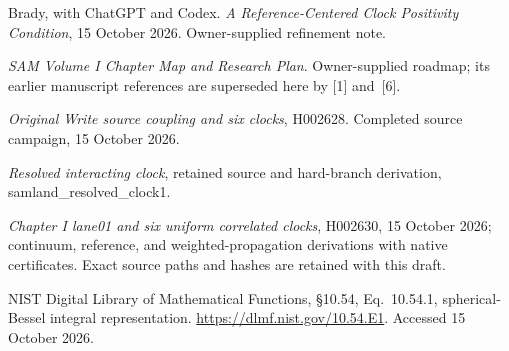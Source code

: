 \documentclass[10pt,twocolumn,letterpaper]{article}
\begin{document}
\noindent[2] Brady, with ChatGPT and Codex. \emph{A Reference-Centered Clock Positivity Condition}, 15 October 2026. Owner-supplied refinement note.

\noindent[3] \emph{SAM Volume I Chapter Map and Research Plan}. Owner-supplied roadmap; its earlier manuscript references are superseded here by [1] and~[6].

\noindent[4] \emph{Original Write source coupling and six clocks}, H002628. Completed source campaign, 15 October 2026.

\noindent[5] \emph{Resolved interacting clock}, retained source and hard-branch derivation, samland\_resolved\_clock1.

\noindent[6] \emph{Chapter I lane01 and six uniform correlated clocks}, H002630, 15 October 2026; continuum, reference, and weighted-propagation derivations with native certificates. Exact source paths and hashes are retained with this draft.

\noindent[7] NIST Digital Library of Mathematical Functions, \S10.54, Eq.~10.54.1, spherical-Bessel integral representation. \url{https://dlmf.nist.gov/10.54.E1}. Accessed 15 October 2026.

\endgroup
\end{document}
